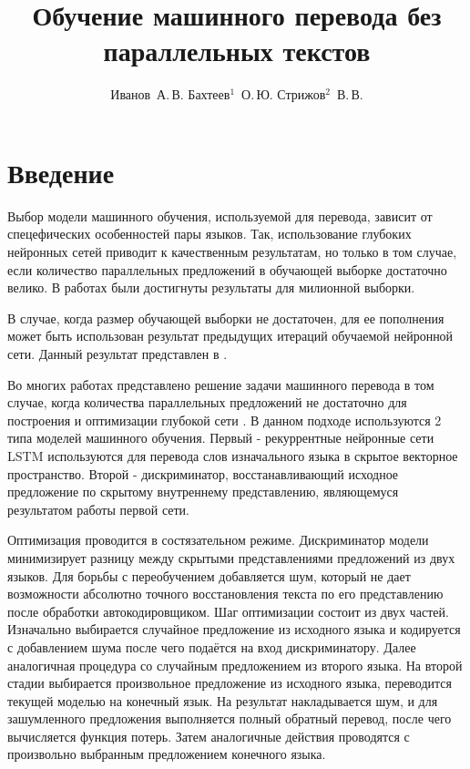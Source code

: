 \documentclass[12pt,twoside]{article}
\title
    [Обучение машинного перевода без параллельных текстов] %
    {Обучение машинного перевода без параллельных текстов}
\author
    [Иванов~А.\,В. Бахтеев$^1$~О.\,Ю.  Стрижов$^2$~В.\,В.] %
{Иванов~А.\,В. Бахтеев$^1$~О.\,Ю.  Стрижов$^2$~В.\,В.} %
[Иванов~А.\,В. Бахтеев$^1$~О.\,Ю.  Стрижов$^2$~В.\,В.] %
\begin{document}
\maketitle

\section{Введение}

Выбор модели машинного обучения, используемой для перевода, зависит от спецефических особенностей пары языков. Так, использование глубоких нейронных сетей приводит к качественным результатам, но только в том случае, если количество параллельных предложений в обучающей выборке достаточно велико. В работах  \cite{zou2013bilingual, cho2014properties} были достигнуты результаты для милионной выборки. 

В случае, когда размер обучающей выборки не достаточен, для ее пополнения может быть использован результат предыдущих итераций обучаемой нейронной сети. Данный результат представлен в \cite{bertoldi2009domain}.

Во многих работах представлено решение задачи машинного перевода в том случае, когда количества параллельных предложений не достаточно для построения и оптимизации  глубокой сети \cite{wu2016google, sutskever2014sequence, bahdanau2014neural}. В данном подходе используются 2 типа моделей машинного обучения. Первый - рекуррентные нейронные сети LSTM \cite{graves2005framewise} используются для перевода слов изначального языка в скрытое векторное пространство. Второй - дискриминатор, восстанавливающий исходное предложение по скрытому внутреннему представлению, являющемуся результатом работы первой сети.

Оптимизация проводится в состязательном режиме. Дискриминатор модели минимизирует разницу между скрытыми представлениями предложений из двух языков. Для борьбы с переобучением добавляется шум, который не дает возможности абсолютно точного восстановления текста по его представлению после обработки автокодировщиком. Шаг оптимизации состоит из двух частей. Изначально выбирается случайное предложение из исходного языка и кодируется с добавлением шума \cite{kimimproving} после чего подаётся на вход дискриминатору. Далее аналогичная процедура со случайным предложением из второго языка. На второй стадии выбирается произвольное предложение из исходного языка, переводится текущей моделью на конечный язык. На результат накладывается шум, и для зашумленного предложения выполняется полный обратный перевод, после чего вычисляется функция потерь. Затем аналогичные действия проводятся с произвольно выбранным предложением конечного языка.
\end{document}
